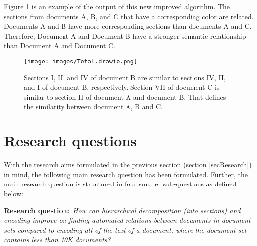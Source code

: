 Figure \ref{imgtotal} is an example of the output of this new improved algorithm. The sections from documents A, B, and C that have a corresponding color are related. Documents A and B have more corresponding sections than documents A and C. Therefore, Document A and Document B have a stronger semantic relationship than Document A and Document C.\\
 

\begin{figure}[h]
\centering
\captionsetup{justification=centering}
\texttt{[image: images/Total.drawio.png]}
\caption{Sections I, II, and IV of document B are similar to sections IV, II, and  I of document B, respectively. Section VII of document C is similar to section II of document A and document B. That defines the similarity between document A, B and C.}
\label{imgtotal}
\end{figure}


\section{Research questions}
\label{secResearchQuestions}
With the research aims formulated in the previous section (section \ref{secResearch}) in mind, the following main research question has been formulated. Further, the main research question is structured in four smaller sub-questions as defined below: 

\textbf{Research question:}~\textit{How can hierarchical decomposition (into sections) and encoding improve on finding automated relations between documents in document sets compared to encoding all of the text of a document, where the document set contains less than 10K documents?}

